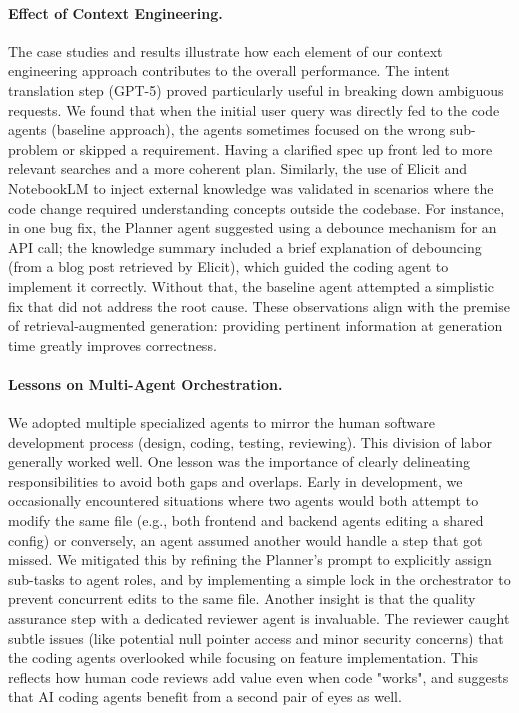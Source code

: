 \documentclass[11pt]{article}
\begin{document}
\paragraph{Effect of Context Engineering.} The case studies and results illustrate how each element of our context engineering approach contributes to the overall performance. The intent translation step (GPT-5) proved particularly useful in breaking down ambiguous requests. We found that when the initial user query was directly fed to the code agents (baseline approach), the agents sometimes focused on the wrong sub-problem or skipped a requirement. Having a clarified spec up front led to more relevant searches and a more coherent plan. Similarly, the use of Elicit and NotebookLM to inject external knowledge was validated in scenarios where the code change required understanding concepts outside the codebase. For instance, in one bug fix, the Planner agent suggested using a debounce mechanism for an API call; the knowledge summary included a brief explanation of debouncing (from a blog post retrieved by Elicit), which guided the coding agent to implement it correctly. Without that, the baseline agent attempted a simplistic fix that did not address the root cause. These observations align with the premise of retrieval-augmented generation: providing pertinent information at generation time greatly improves correctness.

\paragraph{Lessons on Multi-Agent Orchestration.} We adopted multiple specialized agents to mirror the human software development process (design, coding, testing, reviewing). This division of labor generally worked well. One lesson was the importance of clearly delineating responsibilities to avoid both gaps and overlaps. Early in development, we occasionally encountered situations where two agents would both attempt to modify the same file (e.g., both frontend and backend agents editing a shared config) or conversely, an agent assumed another would handle a step that got missed. We mitigated this by refining the Planner's prompt to explicitly assign sub-tasks to agent roles, and by implementing a simple lock in the orchestrator to prevent concurrent edits to the same file. Another insight is that the quality assurance step with a dedicated reviewer agent is invaluable. The reviewer caught subtle issues (like potential null pointer access and minor security concerns) that the coding agents overlooked while focusing on feature implementation. This reflects how human code reviews add value even when code "works", and suggests that AI coding agents benefit from a second pair of eyes as well.
\end{document}
